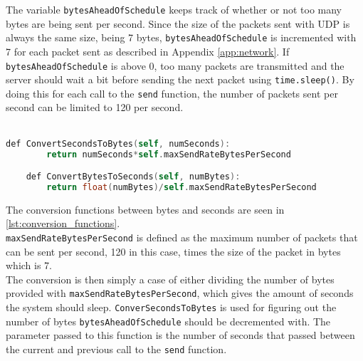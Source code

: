 The variable \texttt{bytesAheadOfSchedule} keeps track of whether or not too many bytes are being sent per second.
Since the size of the packets sent with UDP is always the same size, being 7 bytes, \texttt{bytesAheadOfSchedule} is incremented with 7 for each packet sent as described in Appendix \autoref{app:network}.
If \texttt{bytesAheadOfSchedule} is above 0, too many packets are transmitted and the server should wait a bit before sending the next packet using \texttt{time.sleep()}.
By doing this for each call to the \texttt{send} function, the number of packets sent per second can be limited to 120 per second.
\\\\
\begin{lstlisting}[caption={function for converting seconds to bytes and bytes to seconds}, captionpos=b,language=C,label={lst:conversion_functions}]
    def ConvertSecondsToBytes(self, numSeconds):
        return numSeconds*self.maxSendRateBytesPerSecond

    def ConvertBytesToSeconds(self, numBytes):
        return float(numBytes)/self.maxSendRateBytesPerSecond
\end{lstlisting}
\noindent
The conversion functions between bytes and seconds are seen in \autoref{lst:conversion_functions}.\\
\texttt{maxSendRateBytesPerSecond} is defined as the maximum number of packets that can be sent per second, 120 in this case, times the size of the packet in bytes which is 7.\\
The conversion is then simply a case of either dividing the number of bytes provided with \texttt{maxSendRateBytesPerSecond}, which gives the amount of seconds the system should sleep.
\texttt{ConverSecondsToBytes} is used for figuring out the number of bytes \texttt{bytesAheadOfSchedule} should be decremented with.
The parameter passed to this function is the number of seconds that passed between the current and previous call to the \texttt{send} function.
